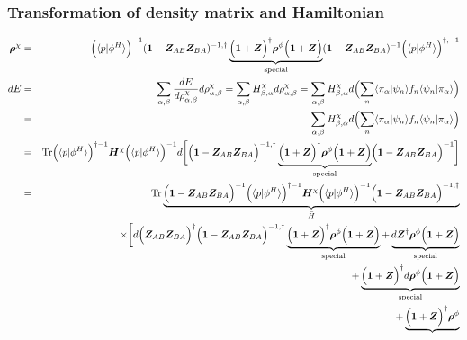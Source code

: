 \documentclass[11pt,a4paper]{report}
\begin{document}
\subsubsection{Transformation of density matrix and Hamiltonian}
\begin{eqnarray}
\mat{\rho}^\chi&=&\Bigl(\langle{p}|\phi^H\rangle\Bigr)^{-1}
(\mat{1}-\mat{Z}_{AB}\mat{Z}_{BA})^{-1,\dagger}
\underbrace{
\Bigl(\mat{1}+\mat{Z}\Bigr)^\dagger
\mat{\rho}^\phi
\Bigl(\mat{1}+\mat{Z}\Bigr)}_{\text{special}}
(\mat{1}-\mat{Z}_{AB}\mat{Z}_{BA})^{-1}
\Bigl(\langle{p}|\phi^H\rangle\Bigr)^{\dagger,-1}
\nonumber\\
dE&=&
\sum_{\alpha,\beta}\frac{dE}{d\rho^\chi_{\alpha,\beta}}d\rho^\chi_{\alpha,\beta}
=\sum_{\alpha,\beta} H^\chi_{\beta,\alpha}d\rho^\chi_{\alpha,\beta}
=\sum_{\alpha,\beta} H^\chi_{\beta,\alpha}d
\Bigl(
\sum_n\langle\pi_\alpha|\psi_n\rangle f_n\langle\psi_n|\pi_\alpha\rangle
\Bigr)
\nonumber\\
%
%
&=&\sum_{\alpha,\beta} H^\chi_{\beta,\alpha}d
\Bigl(\sum_n\langle\pi_\alpha|\psi_n\rangle f_n\langle\psi_n|\pi_\alpha\rangle\Bigr)
\nonumber\\
%
%
&=&\Tr
\Bigl(\langle{p}|\phi^H\rangle\Bigr)^{\dagger-1}
\mat{H}^\chi
\Bigl(\langle{p}|\phi^H\rangle\Bigr)^{-1}
d\biggl[
\Bigl(\mat{1}-\mat{Z}_{AB}\mat{Z}_{BA}\Bigr)^{-1,\dagger}
\underbrace{\Bigl(\mat{1}+\mat{Z}\Bigr)^\dagger
\mat{\rho}^\phi
\Bigl(\mat{1}+\mat{Z}\Bigr)}_{\text{special}}
\Bigl(\mat{1}-\mat{Z}_{AB}\mat{Z}_{BA}\Bigr)^{-1}
\biggr]
\nonumber\\
%
%
&=&\Tr
\underbrace{\Bigl(\mat{1}-\mat{Z}_{AB}\mat{Z}_{BA}\Bigr)^{-1}
\Bigl(\langle{p}|\phi^H\rangle\Bigr)^{\dagger-1}
\mat{H}^\chi
\Bigl(\langle{p}|\phi^H\rangle\Bigr)^{-1}
\Bigl(\mat{1}-\mat{Z}_{AB}\mat{Z}_{BA}\Bigr)^{-1,\dagger}}_{\bar{H}}
\nonumber\\
&&
\times\biggl[
d\Bigl(\mat{Z}_{AB}\mat{Z}_{BA}\Bigr)^\dagger
\Bigl(\mat{1}-\mat{Z}_{AB}\mat{Z}_{BA}\Bigr)^{-1,\dagger}
\underbrace{\Bigl(\mat{1}+\mat{Z}\Bigr)^\dagger
\mat{\rho}^\phi
\Bigl(\mat{1}+\mat{Z}\Bigr)}_{\text{special}}
%
%
+
\underbrace{
d\mat{Z}^\dagger\mat{\rho}^\phi\Bigl(\mat{1}+\mat{Z}\Bigr)}_{\text{special}}
\nonumber\\
&&+
\underbrace{\Bigl(\mat{1}+\mat{Z}\Bigr)^\dagger
d\mat{\rho}^\phi
\Bigl(\mat{1}+\mat{Z}\Bigr)}_{\text{special}}
\nonumber\\
&&+
\underbrace{\Bigl(\mat{1}+\mat{Z}\Bigr)^\dagger\mat{\rho}^\phi 
}
\end{eqnarray}
\end{document}
